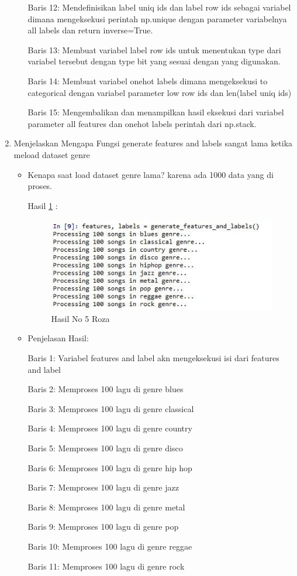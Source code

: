 \begin{enumerate}
\begin{itemize}
\par Baris 12: Mendefinisikan label uniq ids dan label row ids sebagai variabel dimana mengeksekusi perintah np.unique dengan parameter variabelnya all labels dan return inverse=True.
\par Baris 13: Membuat variabel label row ids untuk menentukan type dari variabel tersebut dengan type bit yang sesuai dengan yang digunakan.
\par Baris 14: Membuat variabel onehot labels dimana mengeksekusi to categorical dengan variabel parameter low row ids dan len(label uniq ids)
\par Baris 15: Mengembalikan dan menampilkan hasil eksekusi dari variabel parameter all features dan onehot labels perintah dari np.stack.
\end{itemize}
\par


\item Menjelaskan Mengapa Fungsi generate features and labels sangat lama ketika meload dataset genre
\begin{itemize}
\item Kenapa saat load dataset genre lama? karena ada 1000 data yang di proses.

\par Hasil \ref{no5roza} :
\begin{figure}[!hbtp]
\centering
\includegraphics[scale=0.7]{figures/no5roza.jpeg}
\caption{Hasil No 5 Roza}
\label{no5roza}
\end{figure}
\item Penjelasan Hasil:
\par Baris 1: Variabel features and label akn mengeksekusi isi dari features and label
\par Baris 2: Memproses 100 lagu di genre blues
\par Baris 3: Memproses 100 lagu di  genre classical
\par Baris 4: Memproses 100 lagu di  genre country
\par Baris 5: Memproses 100 lagu di  genre disco
\par Baris 6: Memproses 100 lagu di  genre  hip hop
\par Baris 7: Memproses 100 lagu di  genre jazz
\par Baris 8: Memproses 100 lagu di  genre metal
\par Baris 9: Memproses 100 lagu di genre pop
\par Baris 10: Memproses 100 lagu di genre reggae
\par Baris 11: Memproses 100 lagu di genre rock
\end{itemize}
\par


\end{enumerate}
